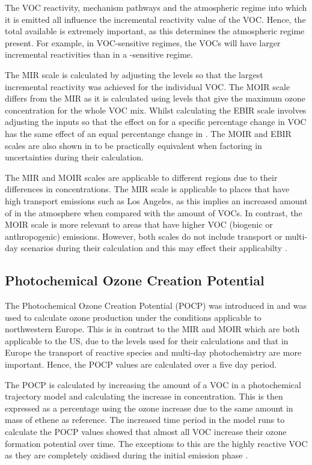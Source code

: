 The VOC reactivity, mechanism pathways and the atmospheric regime into which it is emitted all influence the incremental 
reactivity value of the VOC. Hence, the total  available is extremely important, as this determines the atmospheric 
regime present. For example, in VOC-sensitive regimes, the VOCs will have larger incremental reactivities than in a 
-sensitive regime.

The MIR scale is calculated by adjusting the  levels so that the largest incremental reactivity was achieved for the 
individual VOC. The MOIR scale differs from the MIR as it is calculated using  levels that give the maximum ozone 
concentration for the whole VOC mix.  Whilst calculating the EBIR scale involves adjusting the  inputs so that the 
effect on  for a specific percentage change in VOC has the same effect of an equal percentange change in  
\citep{Carter:1994}. The MOIR and EBIR scales are also shown in \citep{Carter:1994} to be practically equivalent when factoring 
in uncertainties during their calculation.

The MIR and MOIR scales are applicable to different regions due to their differences in  concentrations. The MIR scale
is applicable to places that have high transport emissions such as Los Angeles, as this implies an increased amount of 
 in the atmosphere when compared with the amount of VOCs. In contrast, the MOIR scale is more relevant to areas that 
have higher VOC (biogenic or anthropogenic) emissions. However, both scales do not include transport or multi-day scenarios 
during their calculation and this may effect their applicabilty \citep{Capps:2010}.

\subsection{Photochemical Ozone Creation Potential}
The Photochemical Ozone Creation Potential (POCP) was introduced in \citep{Derwent:1996} and was used to calculate ozone 
production under the conditions applicable to northwestern Europe. This is in contrast to the MIR and MOIR which are both 
applicable to the US, due to the  levels used for their calculations and that in Europe the transport of reactive 
species and multi-day photochemistry are more important. Hence, the POCP values are calculated over a five day period.

The POCP is calculated by increasing the amount of a VOC in a photochemical trajectory model and calculating the increase in 
 concentration. This is then expressed as a percentage using the ozone increase due to the same amount in mass of ethene
as reference. The increased time period in the model runs  to calculate the POCP values showed that almost all VOC increase 
their ozone formation potential over time. The exceptions to this are the highly reactive VOC as they are completely oxidised 
during the initial emission phase \citep{Derwent:1996}. 


